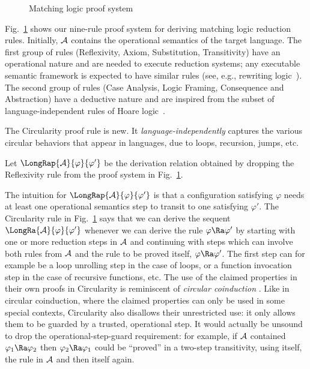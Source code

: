 \documentclass{llncs}
\begin{document}
\begin{figure}[t]

\caption{ Matching logic proof system}
\label{fig:proof-system}
\vspace*{-2ex}
\end{figure}

Fig.~\ref{fig:proof-system} shows our nine-rule proof system for deriving
matching logic reduction rules.  Initially, $\cal A$ contains the operational
semantics of the target language.  The first group of rules (Reflexivity, Axiom,
Substitution, Transitivity) have an operational nature and are needed to execute
reduction systems; any executable semantic framework is expected to have similar
rules (see, e.g., rewriting logic~\cite{meseguer92}).  The second group of rules
(Case Analysis, Logic Framing, Consequence and Abstraction) have a deductive
nature and are inspired from the subset of language-independent rules of Hoare
logic~\cite{hoare-69}.

The Circularity proof rule is new.  It {\em language-independently} captures the
various circular behaviors that appear in languages, due to loops, recursion,
jumps, etc.
%
\begin{definition}
\label{dfn:Raplus}

Let $\LongRap{\cal A}{\varphi}{\varphi'}$ be the derivation relation obtained by
dropping the Reflexivity rule from the proof system in Fig.~\ref{fig:proof-system}.

\end{definition}
%
The intuition for $\LongRap{\cal A}{\varphi}{\varphi'}$ is that a configuration
satisfying $\varphi$ needs at least one operational semantics step to transit to
one satisfying $\varphi'$.  The Circularity rule in Fig.~\ref{fig:proof-system}
says that we can derive the sequent $\LongRa{\cal A}{\varphi}{\varphi'}$
whenever we can derive the rule $\varphi \Ra \varphi'$ by starting with one or
more reduction steps in ${\cal A}$ and continuing with steps which can involve
both rules from ${\cal A}$ and the rule to be proved itself, $\varphi \Ra
\varphi'$.  The first step can for example be a loop unrolling step in the case
of loops, or a function invocation step in the case of recursive functions, etc.
%
The use of the claimed properties in their own proofs in Circularity is
reminiscent of {\em circular coinduction} \cite{rosu-lucanu-2009-calco}.  Like
in circular coinduction, where the claimed properties can only be used in some
special contexts, Circularity also disallows their unrestricted use: it only
allows them to be guarded by a trusted, operational step.  It would actually be
unsound to drop the operational-step-guard requirement: for example, if ${\cal
A}$ contained $\varphi_1 \Ra \varphi_2$ then $\varphi_2 \Ra \varphi_1$ could be
``proved'' in a two-step transitivity, using itself, the rule in $\cal A$ and
then itself again.
\end{document}
